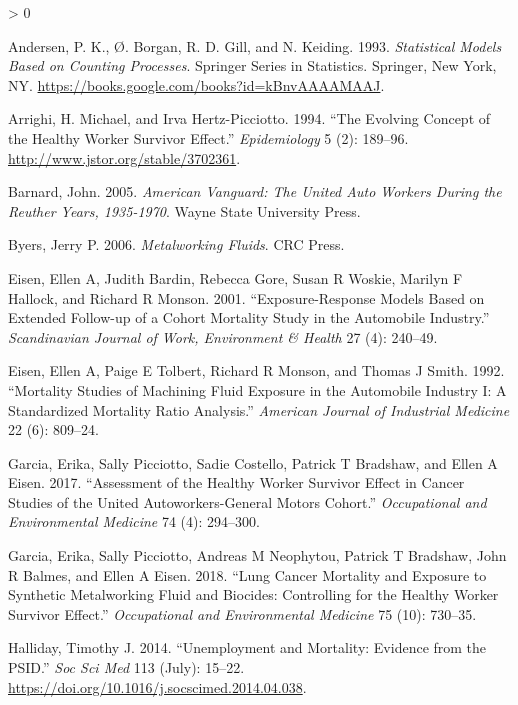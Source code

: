 \documentclass[
  11pt,
]{article}
\newlength{\cslhangindent}
\newenvironment{CSLReferences}[2] %
 {%
  \setlength{\parindent}{0pt}
  \ifodd #1 \everypar{\setlength{\hangindent}{\cslhangindent}}\ignorespaces\fi
  \ifnum #2 > 0
  \setlength{\parskip}{#2\baselineskip}
  \fi
 }%
 {}
\begin{document}
\hypertarget{refs}{}
\begin{CSLReferences}{1}{0}
\leavevmode\hypertarget{ref-Andersen_1993}{}%
Andersen, P. K., Ø. Borgan, R. D. Gill, and N. Keiding. 1993.
\emph{Statistical Models Based on Counting Processes}. Springer Series
in Statistics. Springer, New York, NY.
\url{https://books.google.com/books?id=kBnvAAAAMAAJ}.

\leavevmode\hypertarget{ref-Arrighi_1994}{}%
Arrighi, H. Michael, and Irva Hertz-Picciotto. 1994. {``The Evolving
Concept of the Healthy Worker Survivor Effect.''} \emph{Epidemiology} 5
(2): 189--96. \url{http://www.jstor.org/stable/3702361}.

\leavevmode\hypertarget{ref-Barnard_2005}{}%
Barnard, John. 2005. \emph{American Vanguard: The United Auto Workers
During the Reuther Years, 1935-1970}. Wayne State University Press.

\leavevmode\hypertarget{ref-Byers_2006}{}%
Byers, Jerry P. 2006. \emph{Metalworking Fluids}. CRC Press.

\leavevmode\hypertarget{ref-Eisen_2001}{}%
Eisen, Ellen A, Judith Bardin, Rebecca Gore, Susan R Woskie, Marilyn F
Hallock, and Richard R Monson. 2001. {``Exposure-Response Models Based
on Extended Follow-up of a Cohort Mortality Study in the Automobile
Industry.''} \emph{Scandinavian Journal of Work, Environment \& Health}
27 (4): 240--49.

\leavevmode\hypertarget{ref-Eisen_1992}{}%
Eisen, Ellen A, Paige E Tolbert, Richard R Monson, and Thomas J Smith.
1992. {``Mortality Studies of Machining Fluid Exposure in the Automobile
Industry {I}: A Standardized Mortality Ratio Analysis.''} \emph{American
Journal of Industrial Medicine} 22 (6): 809--24.

\leavevmode\hypertarget{ref-Garcia_2017}{}%
Garcia, Erika, Sally Picciotto, Sadie Costello, Patrick T Bradshaw, and
Ellen A Eisen. 2017. {``Assessment of the Healthy Worker Survivor Effect
in Cancer Studies of the United Autoworkers-General Motors Cohort.''}
\emph{Occupational and Environmental Medicine} 74 (4): 294--300.

\leavevmode\hypertarget{ref-Garcia_2018}{}%
Garcia, Erika, Sally Picciotto, Andreas M Neophytou, Patrick T Bradshaw,
John R Balmes, and Ellen A Eisen. 2018. {``Lung Cancer Mortality and
Exposure to Synthetic Metalworking Fluid and Biocides: Controlling for
the Healthy Worker Survivor Effect.''} \emph{Occupational and
Environmental Medicine} 75 (10): 730--35.

\leavevmode\hypertarget{ref-Halliday_2014}{}%
Halliday, Timothy J. 2014. {``Unemployment and Mortality: Evidence from
the PSID.''} \emph{Soc Sci Med} 113 (July): 15--22.
\url{https://doi.org/10.1016/j.socscimed.2014.04.038}.


\end{CSLReferences}
\end{document}
